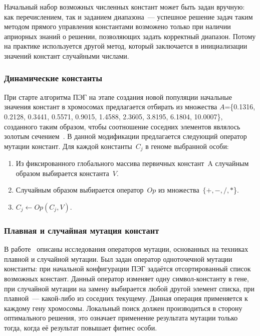 Начальный набор возможных численных констант может быть задан вручную: как перечислением, так и заданием диапазона~--- успешное решение задач таким методом прямого управления константами возможено только при наличии априорных знаний о решении, позволяющих задать корректный диапазон. Потому на практике используется другой метод, который заключается в инициализации значений констант случайными числами.


\subsubsection{Динамические константы}

При старте алгоритма ПЭГ на этапе создания новой популяции начальные значения констант в хромосомах предлагается отбирать из множества $A$=\{0.1316, 0.2128, 0.3441, 0.5571, 0.9015, 1.4588, 2.3605, 3.8195, 6.1804, 10.0007\}, созданного таким образом, чтобы соотношение соседних элементов являлось золотым сечением~\cite{Peng:2007:FFC:1304604.1305824}. В данной модификации предлагается следующий оператор мутации констант. Для каждой константы~$C_j$ в геноме выбранной особи:
\begin{enumerate} \itemsep0pt \parskip0pt 
  \item Из фиксированного глобального массива первичных констант~A случайным образом выбирается константа~$V$.
  \item Случайным образом выбирается оператор~$Op$ из множества~$\{+, -, /, *$\}.
  \item $C_j \leftarrow Op(C_j, V)$.
\end{enumerate}


\subsubsection{Плавная и случайная мутация констант}

В работе~\cite{li:2004:lbp} описаны исследования операторов мутации, основанных на техниках плавной и случайной мутации. Был задан оператор одноточечной мутации константы: при начальной конфигурации ПЭГ задаётся отсортированный список возможных констант. Данный оператор изменяет одну символ-константу в гене, при случайной мутации на замену выбирается любой другой элемент списка, при плавной~--- какой-либо из соседних текущему. Данная операция применяется к каждому гену хромосомы. Локальный поиск должен производиться в сторону оптимального решения, это означает применение результата мутации только тогда, когда её результат повышает фитнес особи.

